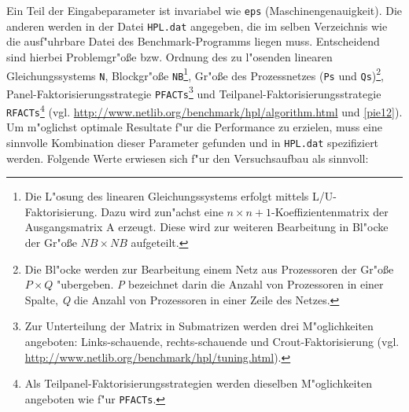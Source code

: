 Ein Teil der Eingabeparameter ist invariabel wie \texttt{eps} (Maschinengenauigkeit). Die anderen werden in der Datei \texttt{HPL.dat} angegeben, die im selben Verzeichnis wie die ausf"uhrbare Datei des Benchmark-Programms liegen muss. Entscheidend sind hierbei Problemgr"o\ss e bzw. Ordnung des zu l"osenden linearen Gleichungssystems \texttt{N}, Blockgr"o\ss e \texttt{NB}\footnote{Die L"osung des linearen Gleichungssystems erfolgt mittels L/U-Faktorisierung. Dazu wird zun"achst eine $n\times n+1$-Koeffizientenmatrix der Ausgangsmatrix A erzeugt. Diese wird zur weiteren Bearbeitung in Bl"ocke der Gr"o\ss e $NB\times NB$ aufgeteilt.}, Gr"o\ss e des Prozessnetzes (\texttt{Ps} und \texttt{Qs})\footnote{Die Bl"ocke werden zur Bearbeitung einem Netz aus Prozessoren der Gr"o\ss e $P\times Q$ "ubergeben. \textit{P} bezeichnet darin die Anzahl von Prozessoren in einer Spalte, \textit{Q} die Anzahl von Prozessoren in einer Zeile des Netzes.}, Panel-Faktorisierungsstrategie \texttt{PFACTs}\footnote{Zur Unterteilung der Matrix in Submatrizen werden drei M"oglichkeiten angeboten: Links-schauende, rechts-schauende und Crout-Faktorisierung (vgl. \url{http://www.netlib.org/benchmark/hpl/tuning.html}).} und Teilpanel-Faktorisierungsstrategie \texttt{RFACTs}\footnote{Als Teilpanel-Faktorisierungsstrategien werden dieselben M"oglichkeiten angeboten wie f"ur \texttt{PFACTs}.} (vgl. \url{http://www.netlib.org/benchmark/hpl/algorithm.html} und \ref{pie12}). Um m"og\-lichst optimale Resultate f"ur die Performance zu erzielen, muss eine sinnvolle Kombination dieser Parameter gefunden und in \texttt{HPL.dat} spezifiziert werden. Folgende Werte erwiesen sich f"ur den Versuchsaufbau als sinnvoll: 
